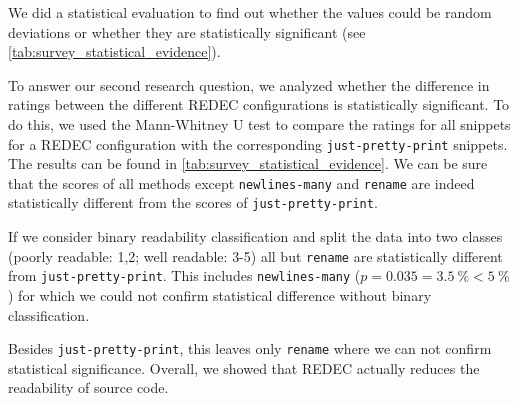 \documentclass[%
class=scrreprt,
chapterprefix=false,%
open=right,%
twoside=false,%
paper=a4,%
logofile={Logo\_zentral\_farbig\_EN.png},%
thesistype=master,%
UKenglish,%
]{se2thesis}
\theoremstyle{definition}
\newcommand{\rdh}{REDEC\xspace}
\newcommand{\none}{just-pretty-print\xspace} %
\newcommand{\nonet}{\texttt{\none}\xspace} %
\begin{document}
	We did a statistical evaluation to find out whether the values could be random deviations or whether they are statistically significant (see \autoref{tab:survey_statistical_evidence}).
	
	To answer our second research question, we analyzed whether the difference in ratings between the different \rdh configurations is statistically significant. To do this, we used the Mann-Whitney U test to compare the ratings for all snippets for a \rdh configuration with the corresponding \nonet snippets. The results can be found in \autoref{tab:survey_statistical_evidence}.
	We can be sure that the scores of all methods except \texttt{newlines-many} and \texttt{rename} are indeed statistically different from the scores of \nonet. 
	
	If we consider binary readability classification and split the data into two classes (poorly readable: 1,2; well readable: 3-5) all but \texttt{rename} are statistically different from \nonet. This includes \texttt{newlines-many} ($p=0.035=3.5~\% < 5~\%$) for which we could not confirm statistical difference without binary classification.

	Besides \nonet, this leaves only \texttt{rename} where we can not confirm statistical significance. Overall, we showed that \rdh actually reduces the readability of source code.

\end{document}
